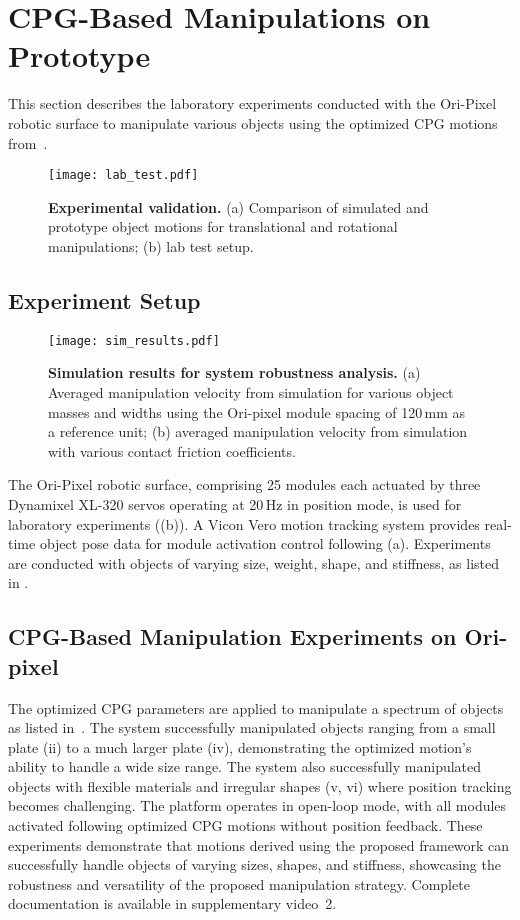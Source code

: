 \section{CPG-Based Manipulations on Prototype}
\label{sec:prototype}

This section describes the laboratory experiments conducted with the Ori-Pixel robotic surface to manipulate various objects using the optimized CPG motions from~.

\begin{figure}[t]
    \centering
    \texttt{[image: lab\_test.pdf]}
    \caption{\textbf{Experimental validation.} (a) Comparison of simulated and prototype object motions for translational and rotational manipulations; (b) lab test setup.
    }
    \label{fig:prototype}
\end{figure}

\subsection{Experiment Setup}
\label{sec:exp_setup}
\begin{figure*}[t]
    \centering
    \texttt{[image: sim\_results.pdf]}
    \caption{\textbf{Simulation results for system robustness analysis.} (a) Averaged manipulation velocity from simulation for various object masses and widths using the Ori-pixel module spacing of 120\,mm as a reference unit; (b) averaged manipulation velocity from simulation with various contact friction coefficients.
    }
    \label{fig:dis}
\end{figure*}
The Ori-Pixel robotic surface, comprising 25 modules each actuated by three Dynamixel XL-320 servos operating at 20\,Hz in position mode, is used for laboratory experiments ((b)). A Vicon Vero motion tracking system provides real-time object pose data for module activation control following (a). Experiments are conducted with objects of varying size, weight, shape, and stiffness, as listed in .

\subsection{CPG-Based Manipulation Experiments on Ori-pixel}
\label{sec:lab_exp}

The optimized CPG parameters are applied to manipulate a spectrum of objects as listed in~. The system successfully manipulated objects ranging from a small plate (ii) to a much larger plate (iv), demonstrating the optimized motion's ability to handle a wide size range. The system also successfully manipulated objects with flexible materials and irregular shapes (v, vi) where position tracking becomes challenging. The platform operates in open-loop mode, with all modules activated following optimized CPG motions without position feedback. These experiments demonstrate that motions derived using the proposed framework can successfully handle objects of varying sizes, shapes, and stiffness, showcasing the robustness and versatility of the proposed manipulation strategy. Complete documentation is available in supplementary video~2.


